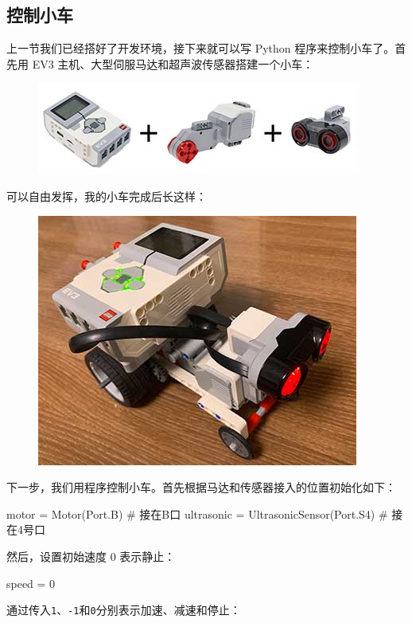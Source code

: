 \hypertarget{ux63a7ux5236ux5c0fux8f66}{%
\subsection{控制小车}\label{ux63a7ux5236ux5c0fux8f66}}

上一节我们已经搭好了开发环境，接下来就可以写 Python
程序来控制小车了。首先用 EV3
主机、大型伺服马达和超声波传感器搭建一个小车：

 
 \begin{figure}[htp]
	\centering
	\includegraphics[width=0.6\linewidth]{fig/1346290325651521l.png}
\end{figure}


可以自由发挥，我的小车完成后长这样：

 
 \begin{figure}[htp]
	\centering
	\includegraphics[width=0.6\linewidth]{fig/1346290294194241l.png}
\end{figure}


下一步，我们用程序控制小车。首先根据马达和传感器接入的位置初始化如下：

\begin{pythoncode}
motor = Motor(Port.B) # 接在B口
ultrasonic = UltrasonicSensor(Port.S4) # 接在4号口
\end{pythoncode}

然后，设置初始速度 0 表示静止：

\begin{pythoncode}
speed = 0
\end{pythoncode}

通过传入\texttt{1}、\texttt{-1}和\texttt{0}分别表示加速、减速和停止：

